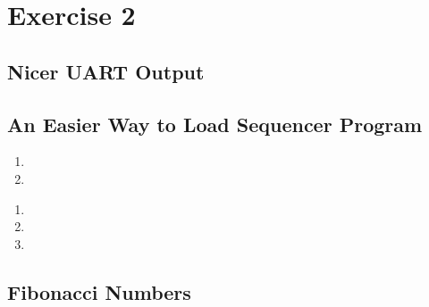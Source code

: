 \documentclass[]{article}
\begin{document}
\section{Exercise 2}


\subsection{Nicer UART Output}
\subsection{An Easier Way to Load Sequencer Program}

\begin{enumerate}
\item 
\item
\end{enumerate}

\begin{enumerate}
\item 
\item
\item
\end{enumerate}

\subsection{Fibonacci Numbers}
\end{document}
